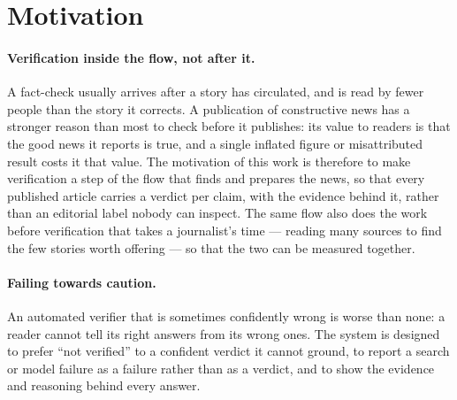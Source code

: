 
\section{Motivation}
\label{sec:motivation}

\paragraph{Verification inside the flow, not after it.} A fact-check
usually arrives after a story has circulated, and is read by fewer
people than the story it corrects. A publication of constructive news
has a stronger reason than most to check before it publishes: its
value to readers is that the good news it reports is true, and a
single inflated figure or misattributed result costs it that value.
The motivation of this work is therefore to make verification a step
of the flow that finds and prepares the news, so that every published
article carries a verdict per claim, with the evidence behind it,
rather than an editorial label nobody can inspect. The same flow also
does the work before verification that takes a journalist's time ---
reading many sources to find the few stories worth offering --- so
that the two can be measured together.

\paragraph{Failing towards caution.} An automated verifier that is
sometimes confidently wrong is worse than none: a reader cannot tell
its right answers from its wrong ones. The system is designed to
prefer ``not verified'' to a confident verdict it cannot ground, to
report a search or model failure as a failure rather than as a
verdict, and to show the evidence and reasoning behind every answer.

